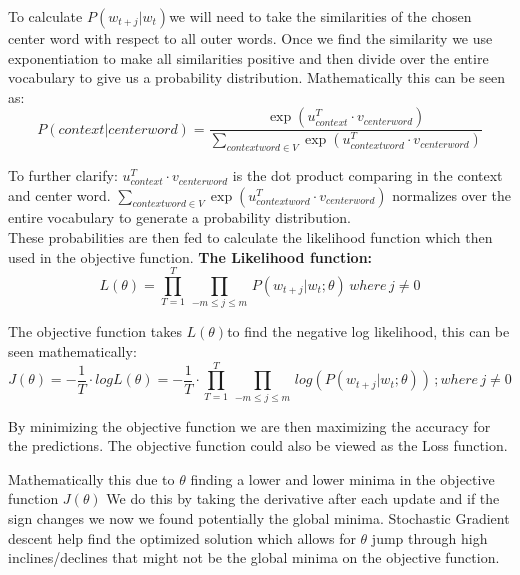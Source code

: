 \documentclass[12pt,a4paper]{report}
\begin{document}
To calculate $P(w_{t+ j} | w_{t}) $we will need to take the similarities of the chosen center word with respect to all outer words. Once we find the similarity we use exponentiation to make all similarities positive and then divide over the entire vocabulary to give us a probability distribution. Mathematically this can be seen as: $$ P( context | center word) = \frac{\exp(u^{T}_{context}\cdot  v_{center word})}
{\sum_{context word \in V} \exp(u^{T}_{context word} \cdot v_{center word})} $$

\textsf{To further clarify:} $u^{T}_{context} \cdot v_{center word} $ is the dot product comparing in the context and center word. $\sum_{context word  \in V} \exp(u^{T}_{context word} \cdot v_{center word})$ normalizes over the entire vocabulary to generate a probability distribution.  \\

These probabilities are then fed to calculate the likelihood function which then used in the objective function.\textbf{ The Likelihood function:} $$ L( \theta) = \prod_{T=1}^{T}  \,  \prod_{-m \leqslant j \leqslant m}  \,   P(w_{t+ j} | w_{t}; \theta)  \, where \,  j \ne 0 $$

The objective function takes $L( \theta) $to find the negative log likelihood, this can be seen mathematically: $$ J(\theta) = - \frac{1}{T} \cdot log L(\theta) = - \frac{1}{T} \cdot \prod_{T=1}^{T}  \,  \prod_{-m \leqslant j \leqslant m}  \,  log( P(w_{t+ j} | w_{t}; \theta))   \, ; where \,  j \ne 0 $$

By minimizing the objective function we are then maximizing the accuracy for the predictions. The objective function could also be viewed as the Loss function. 

Mathematically this due to $\theta $ finding a lower and lower minima in the objective function $J(\theta)$ We do this by taking the derivative after each update and if the sign changes we now we found potentially the global minima. Stochastic Gradient descent help find the optimized solution which allows for $\theta$ jump through high inclines/declines that might not be the global minima on the objective function. 
\end{document}
